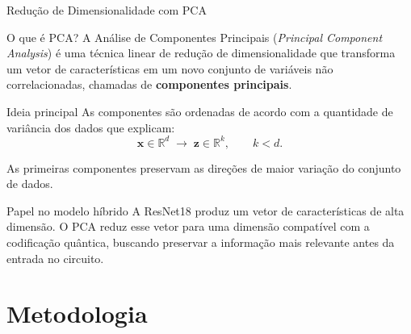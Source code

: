 \begin{frame}{Redução de Dimensionalidade com PCA}

\begin{block}{O que é PCA?}
A Análise de Componentes Principais (\textit{Principal Component Analysis})
é uma técnica linear de redução de dimensionalidade que transforma um vetor
de características em um novo conjunto de variáveis não correlacionadas,
chamadas de \textbf{componentes principais}.
\end{block}

\begin{block}{Ideia principal}
As componentes são ordenadas de acordo com a quantidade de variância dos
dados que explicam:
\[
\mathbf{x}\in\mathbb{R}^{d}
\;\longrightarrow\;
\mathbf{z}\in\mathbb{R}^{k},
\qquad k<d.
\]

As primeiras componentes preservam as direções de maior variação do
conjunto de dados.
\end{block}

\begin{alertblock}{Papel no modelo híbrido}
A ResNet18 produz um vetor de características de alta dimensão. O PCA
reduz esse vetor para uma dimensão compatível com a codificação quântica,
buscando preservar a informação mais relevante antes da entrada no circuito.
\end{alertblock}

\end{frame}

\section{Metodologia}

